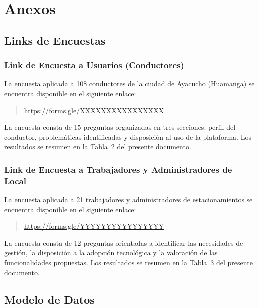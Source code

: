 
\section{Anexos}

\subsection{Links de Encuestas}

\subsubsection{Link de Encuesta a Usuarios (Conductores)}

La encuesta aplicada a 108 conductores de la ciudad de Ayacucho (Huamanga) se encuentra disponible en el siguiente enlace:

\begin{quote}
\url{https://forms.gle/XXXXXXXXXXXXXXXX}
\end{quote}

La encuesta consta de 15 preguntas organizadas en tres secciones: perfil del conductor, problemáticas identificadas y disposición al uso de la plataforma. Los resultados se resumen en la Tabla~2 del presente documento.

\subsubsection{Link de Encuesta a Trabajadores y Administradores de Local}

La encuesta aplicada a 21 trabajadores y administradores de estacionamientos se encuentra disponible en el siguiente enlace:

\begin{quote}
\url{https://forms.gle/YYYYYYYYYYYYYYYY}
\end{quote}

La encuesta consta de 12 preguntas orientadas a identificar las necesidades de gestión, la disposición a la adopción tecnológica y la valoración de las funcionalidades propuestas. Los resultados se resumen en la Tabla~3 del presente documento.

\newpage\subsection{Modelo de Datos}

